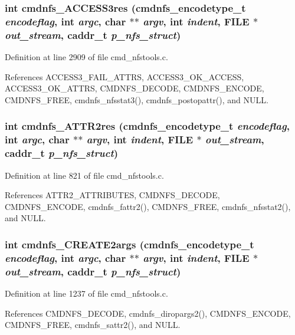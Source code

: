 \subsubsection{\setlength{\rightskip}{0pt plus 5cm}int cmdnfs\_\-ACCESS3res ({\bf cmdnfs\_\-encodetype\_\-t} {\em encodeflag}, int {\em argc}, char $\ast$$\ast$ {\em argv}, int {\em indent}, FILE $\ast$ {\em out\_\-stream}, caddr\_\-t {\em p\_\-nfs\_\-struct})}\label{cmd__nfstools_8h_a49}




Definition at line 2909 of file cmd\_\-nfstools.c.

References ACCESS3\_\-FAIL\_\-ATTRS, ACCESS3\_\-OK\_\-ACCESS, ACCESS3\_\-OK\_\-ATTRS, CMDNFS\_\-DECODE, CMDNFS\_\-ENCODE, CMDNFS\_\-FREE, cmdnfs\_\-nfsstat3(), cmdnfs\_\-postopattr(), and NULL.
\subsubsection{\setlength{\rightskip}{0pt plus 5cm}int cmdnfs\_\-ATTR2res ({\bf cmdnfs\_\-encodetype\_\-t} {\em encodeflag}, int {\em argc}, char $\ast$$\ast$ {\em argv}, int {\em indent}, FILE $\ast$ {\em out\_\-stream}, caddr\_\-t {\em p\_\-nfs\_\-struct})}\label{cmd__nfstools_8h_a24}




Definition at line 821 of file cmd\_\-nfstools.c.

References ATTR2\_\-ATTRIBUTES, CMDNFS\_\-DECODE, CMDNFS\_\-ENCODE, cmdnfs\_\-fattr2(), CMDNFS\_\-FREE, cmdnfs\_\-nfsstat2(), and NULL.
\subsubsection{\setlength{\rightskip}{0pt plus 5cm}int cmdnfs\_\-CREATE2args ({\bf cmdnfs\_\-encodetype\_\-t} {\em encodeflag}, int {\em argc}, char $\ast$$\ast$ {\em argv}, int {\em indent}, FILE $\ast$ {\em out\_\-stream}, caddr\_\-t {\em p\_\-nfs\_\-struct})}\label{cmd__nfstools_8h_a30}




Definition at line 1237 of file cmd\_\-nfstools.c.

References CMDNFS\_\-DECODE, cmdnfs\_\-diropargs2(), CMDNFS\_\-ENCODE, CMDNFS\_\-FREE, cmdnfs\_\-sattr2(), and NULL.
